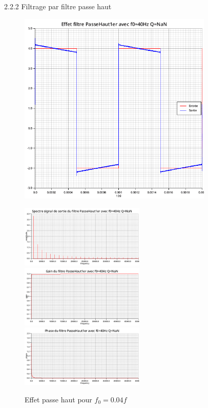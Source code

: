 \documentclass{article}
\newcommand{\expart}[1]
{
    \begin{largeUnderline}#1\end{largeUnderline}\par
}
\begin{document}
\expart{2.2.2 Filtrage par filtre passe haut}

\begin{figure}[H]
  \begin{minipage}{0.6\textwidth}
      \centering
      \includegraphics[width=25em]{images/creneau/haut/0.04/signals.png}
  \end{minipage}
  \begin{minipage}{0.3\textwidth}
      \centering
      \includegraphics[width=16em]{images/creneau/haut/0.04/fft_out.png}
      \vfill
      \includegraphics[width=16em]{images/creneau/haut/0.04/gain.png}
      \vfill
      \includegraphics[width=16em]{images/creneau/haut/0.04/phase.png}
  \end{minipage}
  \caption{Effet passe haut pour $f_0=0.04f$}
\end{figure}
\end{document}
